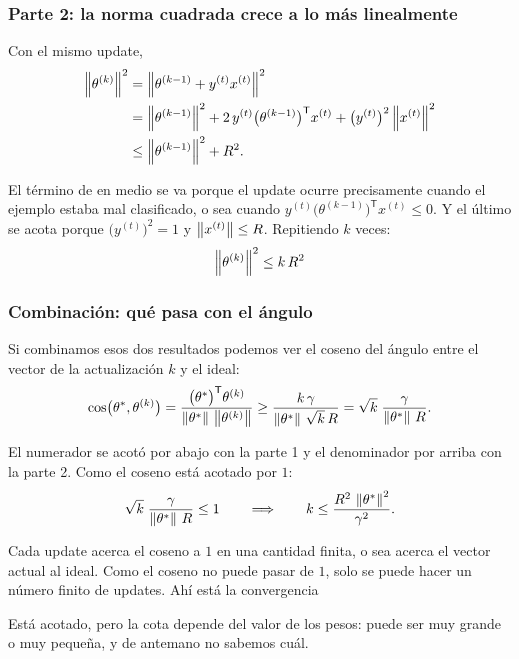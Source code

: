 \documentclass[11pt,letterpaper]{article}
\begin{document}
\subsubsection*{Parte 2: la norma cuadrada crece a lo más linealmente}

Con el mismo update,
\begin{align*}
    \left\lVert \theta^{(k)} \right\rVert^{2}
      &= \left\lVert \theta^{(k-1)} + y^{(t)} x^{(t)} \right\rVert^{2} \\
      &= \left\lVert \theta^{(k-1)} \right\rVert^{2}
         + 2\,y^{(t)} \big(\theta^{(k-1)}\big)^{\mathsf{T}} x^{(t)}
         + \big(y^{(t)}\big)^{2} \left\lVert x^{(t)} \right\rVert^{2} \\
      &\leq \left\lVert \theta^{(k-1)} \right\rVert^{2} + R^{2} .
\end{align*}

El término de en medio se va porque el update ocurre precisamente
cuando el ejemplo estaba mal clasificado, o sea cuando
$y^{(t)} \big(\theta^{(k-1)}\big)^{\mathsf{T}} x^{(t)} \leq 0$. Y el
último se acota porque $\big(y^{(t)}\big)^{2} = 1$ y
$\left\lVert x^{(t)} \right\rVert \leq R$. Repitiendo $k$ veces:
\[
    \left\lVert \theta^{(k)} \right\rVert^{2} \leq k\,R^{2} 
\]

\subsubsection*{Combinación: qué pasa con el ángulo}

Si combinamos esos dos resultados podemos ver el coseno del ángulo
entre el vector de la actualización $k$ y el ideal:
\[
    \cos\!\big(\theta^{*}, \theta^{(k)}\big) =
    \frac{\big(\theta^{*}\big)^{\mathsf{T}} \theta^{(k)}}
         {\left\lVert \theta^{*} \right\rVert\,\left\lVert \theta^{(k)} \right\rVert}
    \geq \frac{k\,\gamma}{\left\lVert \theta^{*} \right\rVert\,\sqrt{k}\,R}
    = \sqrt{k}\;\frac{\gamma}{\left\lVert \theta^{*} \right\rVert\,R} .
\]

El numerador se acotó por abajo con la parte 1 y el denominador por
arriba con la parte 2. Como el coseno está acotado por $1$:
\[
    \sqrt{k}\;\frac{\gamma}{\left\lVert \theta^{*} \right\rVert\,R} \leq 1
    \qquad\Longrightarrow\qquad
    k \leq \frac{R^{2}\,\left\lVert \theta^{*} \right\rVert^{2}}{\gamma^{2}} .
\]

\begin{idea}
  Cada update acerca el coseno a $1$ en una cantidad finita, o sea
  acerca el vector actual al ideal. Como el coseno no puede pasar de
  $1$, solo se puede hacer un número finito de updates. Ahí está la
  convergencia
\end{idea}

\begin{ojo}
  Está acotado, pero la cota depende del valor de los pesos: puede
  ser muy grande o muy pequeña, y de antemano no sabemos cuál.
\end{ojo}
\end{document}
